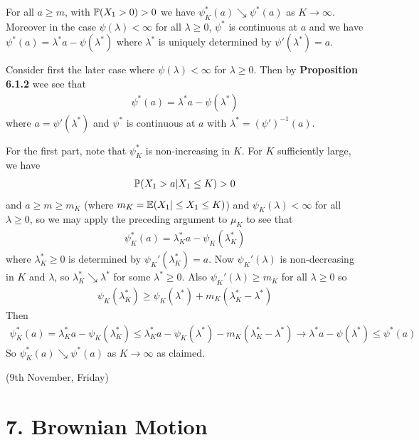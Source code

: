 \documentclass[12pt,a4paper]{report}
\newenvironment{proof}
{\begin{changemargin}{1cm}{0.5cm} 
	}%
	{\end{changemargin}
}
\begin{document}
 For all $a\geq m$, with $\mathbb{P}(X_1 > 0) > 0$ we have $\psi^*_K(a) \searrow \psi^*(a)$ as $K\rightarrow \infty$. Moreover in the case $\psi(\lambda) < \infty$ for all $\lambda \geq 0$, $\psi^*$ is continuous at $a$ and we have $\psi^*(a) =\lambda^* a - \psi(\lambda^*)$ where $\lambda^*$ is uniquely determined by $\psi'(\lambda^*) = a$.
\begin{proof}
\pf Consider first the later case where $\psi(\lambda) < \infty$ for $\lambda \geq 0$. Then by \textbf{Proposition 6.1.2} wee see that
\begin{align*}
\psi^*(a) = \lambda^* a -\psi(\lambda^*)
\end{align*}
where $a= \psi' (\lambda^*)$ and $\psi^*$ is continuous at $a$ with $\lambda^* = (\psi')^{-1}(a)$.
\s

\quad For the first part, note that $\psi_K^*$ is non-increasing in $K$. For $K$ sufficiently large, we have
\begin{align*}
\mathbb{P}(X_1>a | X_1 \leq K) >0
\end{align*}
and $a\geq m \geq m_K$ (where $m_K = \mathbb{E}(X_1 |\leq X_1 \leq K)$) and $\psi_K(\lambda) < \infty$ for all $\lambda \geq 0$, so we may apply the preceding argument to $\mu_K$ to see that
\begin{align*}
\psi^*_K(a) = \lambda_K^* a - \psi_K(\lambda_K^*)
\end{align*}
where $\lambda_K^* \geq 0$ is determined by $\psi_K'(\lambda_K^*) = a$. Now $\psi_K'(\lambda)$ is non-decreasing in $K$ and $\lambda$, so $\lambda_K^* \searrow \lambda^*$ for some $\lambda^* \geq 0$. Also $\psi_K'(\lambda) \geq m_K$ for all $\lambda \geq 0$ so
\begin{align*}
\psi_K(\lambda_K^*) \geq \psi_K(\lambda^*) + m_K(\lambda_K^* - \lambda^*)
\end{align*}
Then
\begin{align*}
\psi^*_K(a) = \lambda_K^* a - \psi_K(\lambda^*_K) \leq \lambda^*_K a - \psi_K(\lambda^*) - m_K(\lambda^*_K - \lambda^*) \rightarrow \lambda^* a - \psi(\lambda^*) \leq \psi^*(a)
\end{align*}
So $\psi_K^*(a) \searrow \psi^*(a)$ as $K\rightarrow \infty$ as claimed.

\eop
\end{proof}
\s

\newday

(9th November, Friday)
\s

\section*{7. Brownian Motion}
\end{document}
